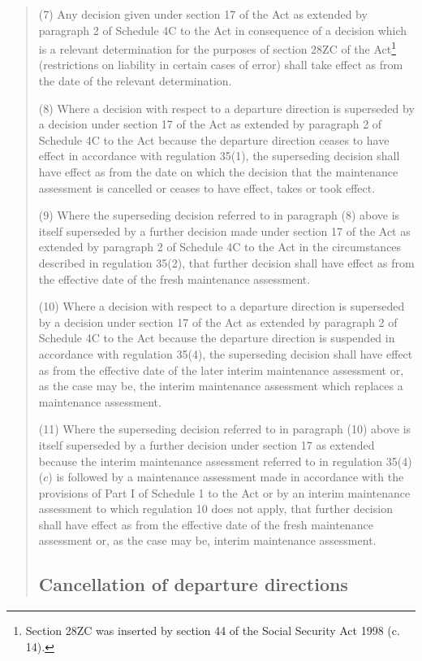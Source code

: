 \documentclass[12pt,a4paper]{article}
\begin{document}
\begin{quotation}
(7) Any decision given under section 17 of the Act as extended by paragraph 2 of Schedule 4C to the Act in consequence of a decision which is a relevant determination for the purposes of section 28ZC of the Act\footnote{\frenchspacing Section 28ZC was inserted by section 44 of the Social Security Act 1998 (c. 14).} (restrictions on liability in certain cases of error) shall take effect as from the date of the relevant determination.

(8) Where a decision with respect to a departure direction is superseded by a decision under section 17 of the Act as extended by paragraph 2 of Schedule 4C to the Act because the departure direction ceases to have effect in accordance with regulation 35(1), the superseding decision shall have effect as from the date on which the decision that the maintenance assessment is cancelled or ceases to have effect, takes or took effect.

(9) Where the superseding decision referred to in paragraph (8) above is itself superseded by a further decision made under section 17 of the Act as extended by paragraph 2 of Schedule 4C to the Act in the circumstances described in regulation 35(2), that further decision shall have effect as from the effective date of the fresh maintenance assessment.

(10) Where a decision with respect to a departure direction is superseded by a decision under section 17 of the Act as extended by paragraph 2 of Schedule 4C to the Act because the departure direction is suspended in accordance with regulation 35(4), the superseding decision shall have effect as from the effective date of the later interim maintenance assessment or, as the case may be, the interim maintenance assessment which replaces a maintenance assessment.

(11) Where the superseding decision referred to in paragraph (10) above is itself superseded by a further decision under section 17 as extended because the interim maintenance assessment referred to in regulation 35(4)($c$) is followed by a maintenance assessment made in accordance with the provisions of Part I of Schedule 1 to the Act or by an interim maintenance assessment to which regulation 10 does not apply, that further decision shall have effect as from the effective date of the fresh maintenance assessment or, as the case may be, interim maintenance assessment.

\subsection*{Cancellation of departure directions}


\end{quotation}
\end{document}

